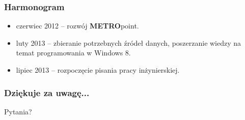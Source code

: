 \documentclass{beamer}
\begin{document}
\begin{frame}
\frametitle{Harmonogram} 
\begin{itemize}
\item czerwiec 2012 -- rozwój \textbf{METRO}point.
\item luty 2013 -- zbieranie potrzebnych źródeł danych, poszerzanie wiedzy na temat programowania w Windows 8.
\item lipiec 2013 -- rozpoczęcie pisania pracy inżynierskiej.
\end{itemize}
\end{frame}


\begin{frame}
\frametitle{Dziękuje za uwagę...}
Pytania?

\end{frame}
\end{document}
